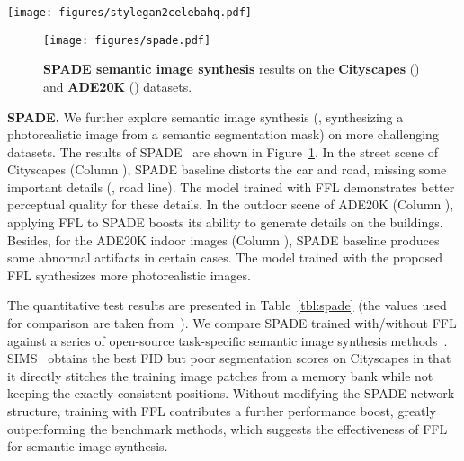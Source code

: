 \documentclass[10pt,twocolumn,letterpaper]{article}
\begin{document}
\begin{figure*}[t]
	\centering
	\vspace{-0.2cm}
	\texttt{[image: figures/stylegan2celebahq.pdf]}
	\vspace{-0.05cm}
	\caption{\textbf{StyleGAN2 unconditional image synthesis} results (without truncation) and the mini-batch average spectra (adjusted to better contrast) on the \textbf{CelebA-HQ} () dataset.}
	\label{fig:stylegan2celebahq}
	\vspace{-0.4cm}
\end{figure*}


\begin{figure}[t]
	\centering
	\vspace{-0.1cm}
	\texttt{[image: figures/spade.pdf]}
\caption{\textbf{SPADE semantic image synthesis} results on the \textbf{Cityscapes} () and \textbf{ADE20K} () datasets.}
	\label{fig:spade}
	\vspace{-0.46cm}
\end{figure}



\vspace{0.05cm}
\noindent
\textbf{SPADE.}
We further explore semantic image synthesis (\ie, synthesizing a photorealistic image from a semantic segmentation mask) on more challenging datasets.
The results of SPADE~\cite{SPADE} are shown in Figure~\ref{fig:spade}.
In the street scene of Cityscapes (Column ), SPADE baseline distorts the car and road, missing some important details (\eg, road line).
The model trained with FFL demonstrates better perceptual quality for these details.
In the outdoor scene of ADE20K (Column ), applying FFL to SPADE boosts its ability to generate details on the buildings.
Besides, for the ADE20K indoor images (Column ), SPADE baseline produces some abnormal artifacts in certain cases. The model trained with the proposed FFL synthesizes more photorealistic images.

The quantitative test results are presented in Table~\ref{tbl:spade} (the values used for comparison are taken from~\cite{SPADE}).
We compare SPADE trained with/without FFL against a series of open-source task-specific semantic image synthesis methods~\cite{CRN,SIMS,pix2pixhd}.
SIMS~\cite{SIMS} obtains the best FID but poor segmentation scores on Cityscapes in that it directly stitches the training image patches from a memory bank while not keeping the exactly consistent positions.
Without modifying the SPADE network structure, training with FFL contributes a further performance boost, greatly outperforming the benchmark methods, which suggests the effectiveness of FFL for semantic image synthesis.
\end{document}
